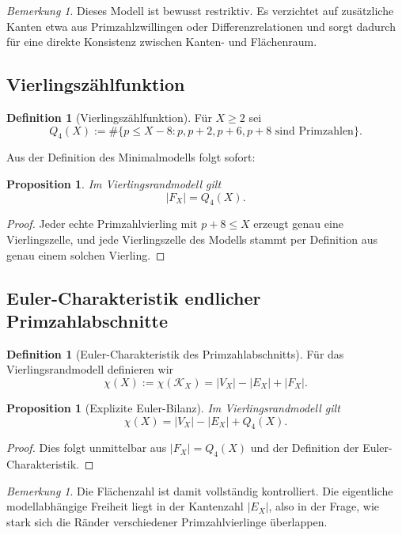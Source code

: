 \documentclass[11pt,a4paper]{article}
\newtheorem{proposition}[theorem]{Proposition}
\theoremstyle{definition}
\newtheorem{definition}[theorem]{Definition}
\theoremstyle{remark}
\newtheorem{remark}[theorem]{Bemerkung}
\newcommand{\VX}{V_X}
\newcommand{\EX}{E_X}
\newcommand{\FX}{F_X}
\newcommand{\KX}{\mathcal{K}_X}
\newcommand{\ChiX}{\chi(X)}
\begin{document}
	\begin{remark}
		Dieses Modell ist bewusst restriktiv. Es verzichtet auf zusätzliche Kanten etwa aus Primzahlzwillingen oder Differenzrelationen und sorgt dadurch für eine direkte Konsistenz zwischen Kanten- und Flächenraum.
	\end{remark}
	
	\subsection{Vierlingszählfunktion}
	
	\begin{definition}[Vierlingszählfunktion]
		Für $X\ge 2$ sei
		\[
		Q_4(X):=\#\{p\le X-8\colon p,p+2,p+6,p+8\text{ sind Primzahlen}\}.
		\]
	\end{definition}
	
	Aus der Definition des Minimalmodells folgt sofort:
	
	\begin{proposition}
		Im Vierlingsrandmodell gilt
		\[
		|\FX|=Q_4(X).
		\]
	\end{proposition}
	
	\begin{proof}
		Jeder echte Primzahlvierling mit $p+8\le X$ erzeugt genau eine Vierlingszelle, und jede Vierlingszelle des Modells stammt per Definition aus genau einem solchen Vierling.
	\end{proof}
	
	\subsection{Euler-Charakteristik endlicher Primzahlabschnitte}
	
	\begin{definition}[Euler-Charakteristik des Primzahlabschnitts]
		Für das Vierlingsrandmodell definieren wir
		\[
		\ChiX:=\chi(\KX)=|\VX|-|\EX|+|\FX|.
		\]
	\end{definition}
	
	\begin{proposition}[Explizite Euler-Bilanz]
		Im Vierlingsrandmodell gilt
		\[
		\ChiX=|\VX|-|\EX|+Q_4(X).
		\]
	\end{proposition}
	
	\begin{proof}
		Dies folgt unmittelbar aus $|\FX|=Q_4(X)$ und der Definition der Euler-Charakteristik.
	\end{proof}
	
	\begin{remark}
		Die Flächenzahl ist damit vollständig kontrolliert. Die eigentliche modellabhängige Freiheit liegt in der Kantenzahl $|\EX|$, also in der Frage, wie stark sich die Ränder verschiedener Primzahlvierlinge überlappen.
	\end{remark}
	
\end{document}
